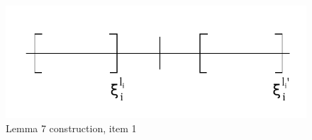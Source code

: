 \documentclass{article}
\begin{document}
\begin{figure}[!h]
  \begin{center}
    \includegraphics{img/07_lemma_7.pdf}
    \caption{Lemma 7 construction, item 1}
    \label{img:lemma7a}
  \end{center}
\end{figure}
\end{document}
